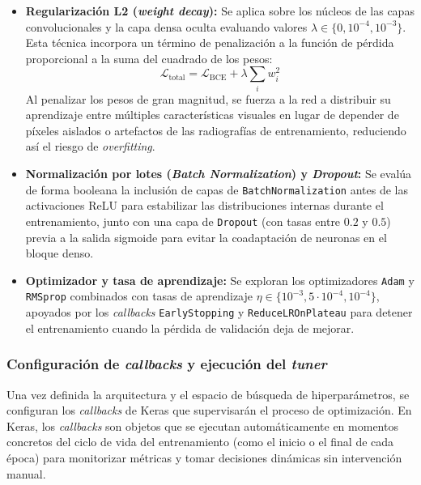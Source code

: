 \documentclass[11pt, a4paper]{article}
\numberwithin{equation}{section}
\begin{document}
\begin{itemize}
    \item \textbf{Regularización L2 (\textit{weight decay}):} Se aplica sobre los núcleos de las capas convolucionales y la capa densa oculta evaluando valores $\lambda \in \{0, 10^{-4}, 10^{-3}\}$. Esta técnica incorpora un término de penalización a la función de pérdida proporcional a la suma del cuadrado de los pesos:
    \begin{equation}
        \mathcal{L}_{\text{total}} = \mathcal{L}_{\text{BCE}} + \lambda \sum_{i} w_i^2
    \end{equation}
    Al penalizar los pesos de gran magnitud, se fuerza a la red a distribuir su aprendizaje entre múltiples características visuales en lugar de depender de píxeles aislados o artefactos de las radiografías de entrenamiento, reduciendo así el riesgo de \textit{overfitting}.
    
    \item \textbf{Normalización por lotes (\textit{Batch Normalization}) y \textit{Dropout}:} Se evalúa de forma booleana la inclusión de capas de \texttt{BatchNormalization} antes de las activaciones ReLU para estabilizar las distribuciones internas durante el entrenamiento, junto con una capa de \texttt{Dropout} (con tasas entre $0.2$ y $0.5$) previa a la salida sigmoide para evitar la coadaptación de neuronas en el bloque denso.
    
    \item \textbf{Optimizador y tasa de aprendizaje:} Se exploran los optimizadores \texttt{Adam} y \texttt{RMSprop} combinados con tasas de aprendizaje $\eta \in \{10^{-3}, 5 \cdot 10^{-4}, 10^{-4}\}$, apoyados por los \textit{callbacks} \texttt{EarlyStopping} y \texttt{ReduceLROnPlateau} para detener el entrenamiento cuando la pérdida de validación deja de mejorar.
\end{itemize}

\subsubsection{Configuración de \textit{callbacks} y ejecución del \textit{tuner}}
Una vez definida la arquitectura y el espacio de búsqueda de hiperparámetros, se configuran los \textit{callbacks} de Keras que supervisarán el proceso de optimización. En Keras, los \textit{callbacks} son objetos que se ejecutan automáticamente en momentos concretos del ciclo de vida del entrenamiento (como el inicio o el final de cada época) para monitorizar métricas y tomar decisiones dinámicas sin intervención manual.
\end{document}
